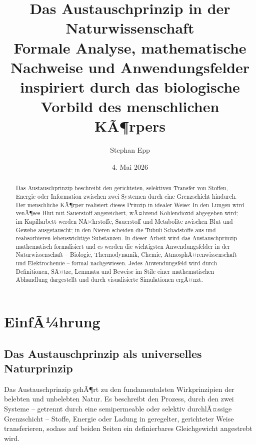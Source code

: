 ﻿\documentclass[a4paper,12pt]{article}
\title{\textbf{Das Austauschprinzip in der Naturwissenschaft}\\
\large Formale Analyse, mathematische Nachweise und Anwendungsfelder\\
inspiriert durch das biologische Vorbild des menschlichen KÃ¶rpers}
\author{Stephan Epp}
\date{4. Mai 2026}
\theoremstyle{definition}
\begin{document}
\maketitle

\begin{abstract}
\noindent
Das Austauschprinzip beschreibt den gerichteten, selektiven Transfer von Stoffen, Energie
oder Information zwischen zwei Systemen durch eine Grenzschicht hindurch. Der menschliche
KÃ¶rper realisiert dieses Prinzip in idealer Weise: In den Lungen wird venÃ¶ses Blut mit
Sauerstoff angereichert, wÃ¤hrend Kohlendioxid abgegeben wird; im Kapillarbett werden
NÃ¤hrstoffe, Sauerstoff und Metabolite zwischen Blut und Gewebe ausgetauscht; in den Nieren
scheiden die Tubuli Schadstoffe aus und reabsorbieren lebenswichtige Substanzen.
In dieser Arbeit wird das Austauschprinzip mathematisch formalisiert und es werden
die wichtigsten Anwendungsfelder in der Naturwissenschaft -- Biologie, Thermodynamik,
Chemie, AtmosphÃ¤renwissenschaft und Elektrochemie -- formal nachgewiesen.
Jedes Anwendungsfeld wird durch Definitionen, SÃ¤tze, Lemmata und Beweise
im Stile einer mathematischen Abhandlung dargestellt und durch visualisierte
Simulationen ergÃ¤nzt.
\end{abstract}

\tableofcontents
\newpage

\section{EinfÃ¼hrung}

\subsection{Das Austauschprinzip als universelles Naturprinzip}

Das Austauschprinzip gehÃ¶rt zu den fundamentalsten Wirkprinzipien der belebten und
unbelebten Natur. Es beschreibt den Prozess, durch den zwei Systeme -- getrennt durch eine
semipermeable oder selektiv durchlÃ¤ssige Grenzschicht -- Stoffe, Energie oder Ladung in
geregelter, gerichteter Weise transferieren, sodass auf beiden Seiten ein definierbares
Gleichgewicht angestrebt wird.
\end{document}
